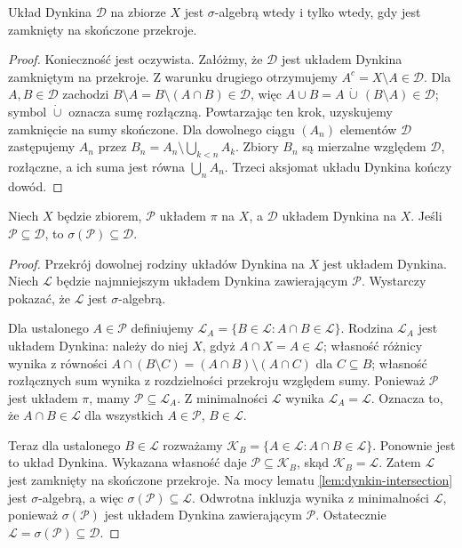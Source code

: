 \begin{lemat}
\label{lem:dynkin-intersection}
Układ Dynkina $\mathcal D$ na zbiorze $X$ jest $\sigma$-algebrą wtedy
i tylko wtedy, gdy jest zamknięty na skończone przekroje.
\end{lemat}
\begin{proof}
Konieczność jest oczywista. Załóżmy, że $\mathcal D$ jest układem
Dynkina zamkniętym na przekroje. Z warunku drugiego otrzymujemy
$A^c=X\setminus A\in\mathcal D$. Dla $A,B\in\mathcal D$ zachodzi
$B\setminus A=B\setminus(A\cap B)\in\mathcal D$, więc
$A\cup B=A\,\dot\cup\,(B\setminus A)\in\mathcal D$; symbol
$\dot\cup$ oznacza sumę rozłączną. Powtarzając ten krok, uzyskujemy
zamknięcie na sumy skończone. Dla dowolnego ciągu $(A_n)$ elementów
$\mathcal D$ zastępujemy $A_n$ przez
$B_n=A_n\setminus\bigcup_{k<n}A_k$. Zbiory $B_n$ są mierzalne względem
$\mathcal D$, rozłączne, a ich suma jest równa $\bigcup_nA_n$.
Trzeci aksjomat układu Dynkina kończy dowód.
\end{proof}

\begin{twierdzenie}
\label{thm:pi-lambda}
Niech $X$ będzie zbiorem, $\mathcal P$ układem $\pi$ na $X$,
a $\mathcal D$ układem Dynkina na $X$. Jeśli
$\mathcal P\subseteq\mathcal D$, to
$\sigma(\mathcal P)\subseteq\mathcal D$.
\end{twierdzenie}
\begin{proof}
Przekrój dowolnej rodziny układów Dynkina na $X$ jest układem Dynkina.
Niech $\mathcal L$ będzie najmniejszym układem Dynkina zawierającym
$\mathcal P$. Wystarczy pokazać, że $\mathcal L$ jest $\sigma$-algebrą.

Dla ustalonego $A\in\mathcal P$ definiujemy
$\mathcal L_A=\{B\in\mathcal L:A\cap B\in\mathcal L\}$.
Rodzina $\mathcal L_A$ jest układem Dynkina: należy do niej $X$, gdyż
$A\cap X=A\in\mathcal L$; własność różnicy wynika z równości
$A\cap(B\setminus C)=(A\cap B)\setminus(A\cap C)$ dla $C\subseteq B$;
własność rozłącznych sum wynika z rozdzielności przekroju względem sumy.
Ponieważ $\mathcal P$ jest układem $\pi$, mamy
$\mathcal P\subseteq\mathcal L_A$. Z minimalności $\mathcal L$ wynika
$\mathcal L_A=\mathcal L$. Oznacza to, że
$A\cap B\in\mathcal L$ dla wszystkich $A\in\mathcal P$, $B\in\mathcal L$.

Teraz dla ustalonego $B\in\mathcal L$ rozważamy
$\mathcal K_B=\{A\in\mathcal L:A\cap B\in\mathcal L\}$.
Ponownie jest to układ Dynkina. Wykazana własność daje
$\mathcal P\subseteq\mathcal K_B$, skąd
$\mathcal K_B=\mathcal L$. Zatem $\mathcal L$ jest zamknięty
na skończone przekroje. Na mocy lematu \ref{lem:dynkin-intersection}
jest $\sigma$-algebrą, a więc $\sigma(\mathcal P)\subseteq\mathcal L$.
Odwrotna inkluzja wynika z minimalności $\mathcal L$, ponieważ
$\sigma(\mathcal P)$ jest układem Dynkina zawierającym $\mathcal P$.
Ostatecznie $\mathcal L=\sigma(\mathcal P)\subseteq\mathcal D$.
\end{proof}

